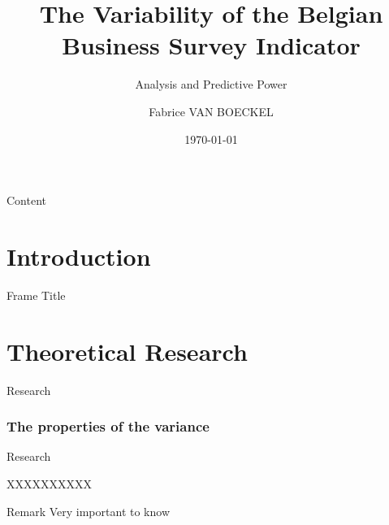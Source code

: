 \documentclass[]{beamer}
\title[The Variability of the Belgian Business Survey Indicator]{The Variability of the Belgian Business Survey Indicator}
\subtitle{Analysis and Predictive Power}
\author[F.\ Van Boeckel]{Fabrice VAN BOECKEL} %
\date{\today} %
\institute[KU Leuven]{Faculty of Science\\ Department of Mathematics\\ Leuven Statistics Research Centre}
\begin{document}
	{
		\maketitle
	}
	\addtocounter{framenumber}{-1} %


\begin{frame}{Content}
    \tableofcontents
\end{frame}

\section{Introduction}
\begin{frame}{Frame Title}
    
\end{frame}
\section{Theoretical Research}
\begin{frame}{Research}
    
\end{frame}

\subsubsection{The properties of the variance }
\begin{frame}{Research}
    
\end{frame}
\begin{frame}{XXXXXXXXXX}
    \begin{kulblock}{Remark}
        Very important to know
    \end{kulblock}
\end{frame}
\end{document}
